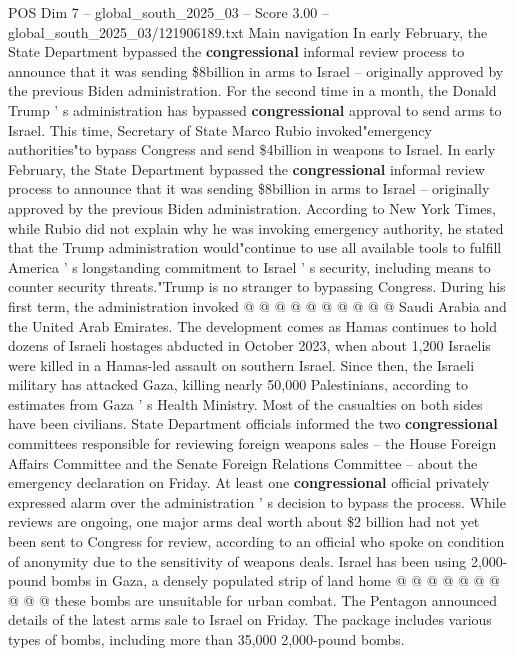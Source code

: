 \begin{textsample}{POS Dim 7 – global\_south\_2025\_03 – Score 3.00 – global\_south\_2025\_03/121906189.txt}  \label{ex:f7_pos_430}
Main navigation In early February, the State Department bypassed the \textbf{congressional} informal review process to announce that it was sending \$8billion in arms to Israel -- originally approved by the previous Biden administration.
For the second time in a month, the Donald Trump ' s administration has bypassed \textbf{congressional} approval to send arms to Israel.
This time, Secretary of State Marco Rubio invoked"emergency authorities"to bypass Congress and send \$4billion in weapons to Israel.
In early February, the State Department bypassed the \textbf{congressional} informal review process to announce that it was sending \$8billion in arms to Israel -- originally approved by the previous Biden administration.
According to New York Times, while Rubio did not explain why he was invoking emergency authority, he stated that the Trump administration would"continue to use all available tools to fulfill America ' s longstanding commitment to Israel ' s security, including means to counter security threats."Trump is no stranger to bypassing Congress.
During his first term, the administration invoked @ @ @ @ @ @ @ @ @ @ Saudi Arabia and the United Arab Emirates.
The development comes as Hamas continues to hold dozens of Israeli hostages abducted in October 2023, when about 1,200 Israelis were killed in a Hamas-led assault on southern Israel.
Since then, the Israeli military has attacked Gaza, killing nearly 50,000 Palestinians, according to estimates from Gaza ' s Health Ministry.
Most of the casualties on both sides have been civilians.
State Department officials informed the two \textbf{congressional} committees responsible for reviewing foreign weapons sales -- the House Foreign Affairs Committee and the Senate Foreign Relations Committee -- about the emergency declaration on Friday.
At least one \textbf{congressional} official privately expressed alarm over the administration ' s decision to bypass the process.
While reviews are ongoing, one major arms deal worth about \$2 billion had not yet been sent to Congress for review, according to an official who spoke on condition of anonymity due to the sensitivity of weapons deals.
Israel has been using 2,000-pound bombs in Gaza, a densely populated strip of land home @ @ @ @ @ @ @ @ @ @ these bombs are unsuitable for urban combat.
The Pentagon announced details of the latest arms sale to Israel on Friday.
The package includes various types of bombs, including more than 35,000 2,000-pound bombs.

\end{textsample}
